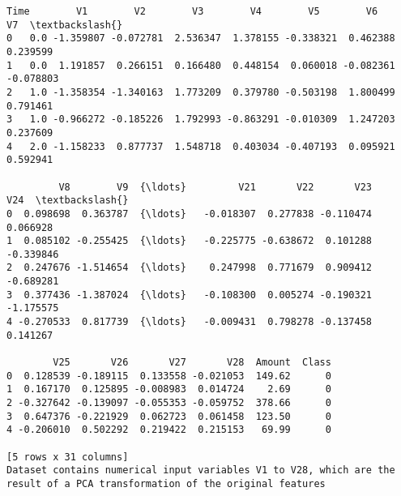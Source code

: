 \documentclass[11pt]{article}
\begin{document}
    \begin{Verbatim}[commandchars=\\\{\}]
   Time        V1        V2        V3        V4        V5        V6        V7  \textbackslash{}
0   0.0 -1.359807 -0.072781  2.536347  1.378155 -0.338321  0.462388  0.239599   
1   0.0  1.191857  0.266151  0.166480  0.448154  0.060018 -0.082361 -0.078803   
2   1.0 -1.358354 -1.340163  1.773209  0.379780 -0.503198  1.800499  0.791461   
3   1.0 -0.966272 -0.185226  1.792993 -0.863291 -0.010309  1.247203  0.237609   
4   2.0 -1.158233  0.877737  1.548718  0.403034 -0.407193  0.095921  0.592941   

         V8        V9  {\ldots}         V21       V22       V23       V24  \textbackslash{}
0  0.098698  0.363787  {\ldots}   -0.018307  0.277838 -0.110474  0.066928   
1  0.085102 -0.255425  {\ldots}   -0.225775 -0.638672  0.101288 -0.339846   
2  0.247676 -1.514654  {\ldots}    0.247998  0.771679  0.909412 -0.689281   
3  0.377436 -1.387024  {\ldots}   -0.108300  0.005274 -0.190321 -1.175575   
4 -0.270533  0.817739  {\ldots}   -0.009431  0.798278 -0.137458  0.141267   

        V25       V26       V27       V28  Amount  Class  
0  0.128539 -0.189115  0.133558 -0.021053  149.62      0  
1  0.167170  0.125895 -0.008983  0.014724    2.69      0  
2 -0.327642 -0.139097 -0.055353 -0.059752  378.66      0  
3  0.647376 -0.221929  0.062723  0.061458  123.50      0  
4 -0.206010  0.502292  0.219422  0.215153   69.99      0  

[5 rows x 31 columns]
Dataset contains numerical input variables V1 to V28, which are the result of a PCA transformation of the original features

    \end{Verbatim}
\end{document}
